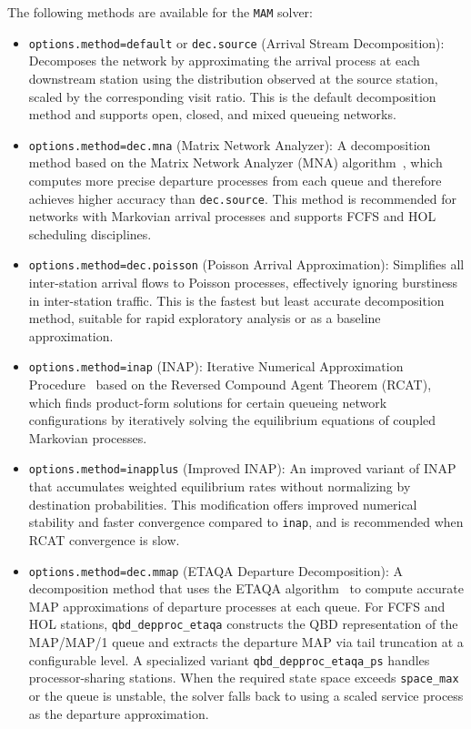 The following methods are available for the \texttt{MAM} solver:
\begin{itemize}
\item \texttt{options.method=default} or \texttt{dec.source} (Arrival Stream Decomposition): Decomposes the network by approximating the arrival process at each downstream station using the distribution observed at the source station, scaled by the corresponding visit ratio. This is the default decomposition method and supports open, closed, and mixed queueing networks.
\item \texttt{options.method=dec.mna} (Matrix Network Analyzer): A decomposition method based on the Matrix Network Analyzer (MNA) algorithm~\cite{ZhuC24}, which computes more precise departure processes from each queue and therefore achieves higher accuracy than \texttt{dec.source}. This method is recommended for networks with Markovian arrival processes and supports FCFS and HOL scheduling disciplines.
\item \texttt{options.method=dec.poisson} (Poisson Arrival Approximation): Simplifies all inter-station arrival flows to Poisson processes, effectively ignoring burstiness in inter-station traffic. This is the fastest but least accurate decomposition method, suitable for rapid exploratory analysis or as a baseline approximation.
\item \texttt{options.method=inap} (INAP): Iterative Numerical Approximation Procedure~\cite{CasH13} based on the Reversed Compound Agent Theorem (RCAT), which finds product-form solutions for certain queueing network configurations by iteratively solving the equilibrium equations of coupled Markovian processes.
\item \texttt{options.method=inapplus} (Improved INAP): An improved variant of INAP~\cite{CasH13} that accumulates weighted equilibrium rates without normalizing by destination probabilities. This modification offers improved numerical stability and faster convergence compared to \texttt{inap}, and is recommended when RCAT convergence is slow.
\item \texttt{options.method=dec.mmap} (ETAQA Departure Decomposition): A decomposition method that uses the ETAQA algorithm~\cite{RisS07} to compute accurate MAP approximations of departure processes at each queue.  For FCFS and HOL stations, \texttt{qbd\_depproc\_etaqa} constructs the QBD representation of the MAP/MAP/1 queue and extracts the departure MAP via tail truncation at a configurable level.  A specialized variant \texttt{qbd\_depproc\_etaqa\_ps} handles processor-sharing stations.  When the required state space exceeds \texttt{space\_max} or the queue is unstable, the solver falls back to using a scaled service process as the departure approximation.
\end{itemize}

